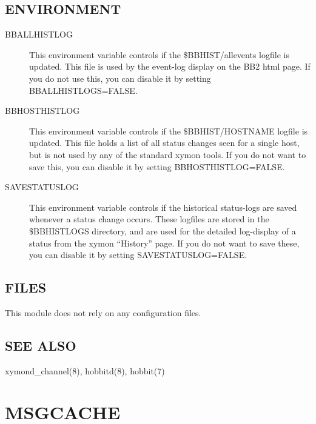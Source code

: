 \subsection{ENVIRONMENT}
\begin{description}
\item[BBALLHISTLOG] This environment variable controls if the
  \$BBHIST/allevents logfile is updated. This file is used by the
  event-log display on the BB2 html page. If you do not use this, you
  can disable it by setting BBALLHISTLOGS=FALSE. 


 

\item[BBHOSTHISTLOG] This environment variable controls if the
  \$BBHIST/HOSTNAME logfile is updated. This file holds a list of all
  status changes seen for a single host, but is not used by any of the
  standard xymon tools. If you do not want to save this, you can
  disable it by setting BBHOSTHISTLOG=FALSE. 


 

\item[SAVESTATUSLOG] This environment variable controls if the
  historical status-logs are saved whenever a status change
  occurs. These logfiles are stored in the \$BBHISTLOGS directory, and
  are used for the detailed log-display of a status from the xymon
  ``History'' page. If you do not want to save these, you can disable
  it by setting SAVESTATUSLOG=FALSE. 


 


\end{description}
\subsection{FILES}
 This module does not rely on any configuration files. 

 
\subsection{SEE ALSO}
xymond\_channel(8), hobbitd(8), hobbit(7) 

  

%

%

\newpage
\section{MSGCACHE}

